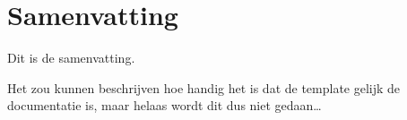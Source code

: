 \chapter*{Samenvatting}
Dit is de samenvatting.

Het zou kunnen beschrijven hoe handig het is dat de template gelijk de
documentatie is, maar helaas wordt dit dus niet gedaan\ldots
